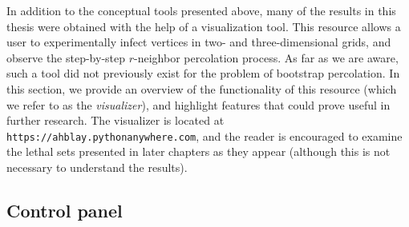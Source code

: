 In addition to the conceptual tools presented above, many of the results in this thesis were obtained with the help of a visualization tool. This resource allows a user to experimentally infect vertices in two- and three-dimensional grids, and observe the step-by-step $r$-neighbor percolation process. As far as we are aware, such a tool did not previously exist for the problem of bootstrap percolation. In this section, we provide an overview of the functionality of this resource (which we refer to as the \emph{visualizer}), and highlight features that could prove useful in further research. The visualizer is located at \texttt{https://ahblay.pythonanywhere.com}, and the reader is encouraged to examine the lethal sets presented in later chapters as they appear (although this is not necessary to understand the results).

\subsection{Control panel}


